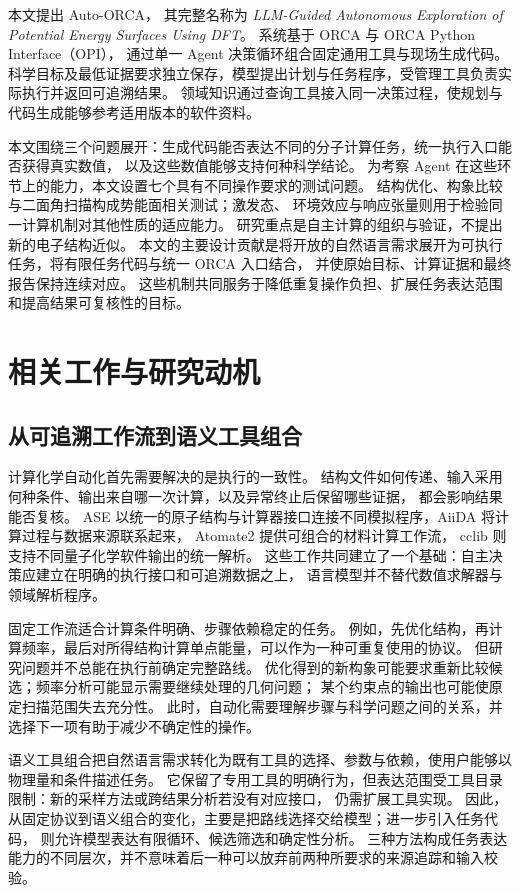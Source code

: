 \documentclass[UTF8,fontset=fandol,a4paper,11pt]{ctexart}
\begin{document}
本文提出 Auto-ORCA，%
其完整名称为 \emph{LLM-Guided Autonomous Exploration of Potential Energy Surfaces Using DFT}。%
系统基于 ORCA 与 ORCA Python Interface（OPI）\cite{orca2020,orca6,opipaper}，%
通过单一 Agent 决策循环组合固定通用工具与现场生成代码。%
科学目标及最低证据要求独立保存，模型提出计划与任务程序，受管理工具负责实际执行并返回可追溯结果。
领域知识通过查询工具接入同一决策过程，使规划与代码生成能够参考适用版本的软件资料。%

本文围绕三个问题展开：生成代码能否表达不同的分子计算任务，统一执行入口能否获得真实数值，%
以及这些数值能够支持何种科学结论。%
为考察 Agent 在这些环节上的能力，本文设置七个具有不同操作要求的测试问题。%
结构优化、构象比较与二面角扫描构成势能面相关测试；激发态、%
环境效应与响应张量则用于检验同一计算机制对其他性质的适应能力。%
研究重点是自主计算的组织与验证，不提出新的电子结构近似。%
本文的主要设计贡献是将开放的自然语言需求展开为可执行任务，将有限任务代码与统一 ORCA 入口结合，%
并使原始目标、计算证据和最终报告保持连续对应。%
这些机制共同服务于降低重复操作负担、扩展任务表达范围和提高结果可复核性的目标。

\section{相关工作与研究动机}
\subsection{从可追溯工作流到语义工具组合}
计算化学自动化首先需要解决的是执行的一致性。%
结构文件如何传递、输入采用何种条件、输出来自哪一次计算，以及异常终止后保留哪些证据，%
都会影响结果能否复核。%
ASE 以统一的原子结构与计算器接口连接不同模拟程序，AiiDA 将计算过程与数据来源联系起来，%
Atomate2 提供可组合的材料计算工作流，%
cclib 则支持不同量子化学软件输出的统一解析\cite{ase,aiida,atomate2,cclib}。%
这些工作共同建立了一个基础：自主决策应建立在明确的执行接口和可追溯数据之上，%
语言模型并不替代数值求解器与领域解析程序。

固定工作流适合计算条件明确、步骤依赖稳定的任务。%
例如，先优化结构，再计算频率，最后对所得结构计算单点能量，可以作为一种可重复使用的协议。%
但研究问题并不总能在执行前确定完整路线。%
优化得到的新构象可能要求重新比较候选；频率分析可能显示需要继续处理的几何问题；%
某个约束点的输出也可能使原定扫描范围失去充分性。%
此时，自动化需要理解步骤与科学问题之间的关系，并选择下一项有助于减少不确定性的操作。

语义工具组合把自然语言需求转化为既有工具的选择、参数与依赖，使用户能够以物理量和条件描述任务。%
它保留了专用工具的明确行为，但表达范围受工具目录限制：新的采样方法或跨结果分析若没有对应接口，%
仍需扩展工具实现。%
因此，从固定协议到语义组合的变化，主要是把路线选择交给模型；进一步引入任务代码，%
则允许模型表达有限循环、候选筛选和确定性分析。%
三种方法构成任务表达能力的不同层次，并不意味着后一种可以放弃前两种所要求的来源追踪和输入校验。
\end{document}
